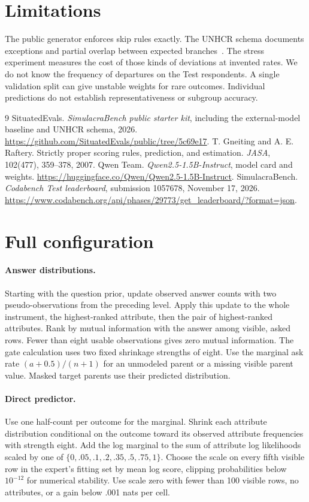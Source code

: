 \documentclass{article}
\begin{document}
\section{Limitations}
The public generator enforces skip rules exactly. The UNHCR schema documents
exceptions and partial overlap between expected branches~\cite{starter}.
The stress experiment measures the cost of those kinds of deviations at
invented rates. We do not know the frequency of departures on the Test respondents.
A single validation split can give unstable weights for rare outcomes.
Individual predictions do not establish representativeness or subgroup accuracy.

\begin{thebibliography}{9}
 SituatedEvals. \emph{SimulacraBench public starter kit},
including the external-model baseline and UNHCR schema, 2026.
\url{https://github.com/SituatedEvals/public/tree/5c69e17}.
 T. Gneiting and A. E. Raftery. Strictly proper scoring rules,
prediction, and estimation. \emph{JASA}, 102(477), 359--378, 2007.
 Qwen Team. \emph{Qwen2.5-1.5B-Instruct}, model card and weights.
\url{https://huggingface.co/Qwen/Qwen2.5-1.5B-Instruct}.
 SimulacraBench. \emph{Codabench Test leaderboard},
submission 1057678, November 17, 2026.
\url{https://www.codabench.org/api/phases/29773/get_leaderboard/?format=json}.
\end{thebibliography}

\clearpage
\appendix
\section{Full configuration}\label{config}
\paragraph{Answer distributions.} Starting with the question prior, update
observed answer counts with two pseudo-observations from the preceding level.
Apply this update to the whole instrument, the highest-ranked attribute, then
the pair of highest-ranked attributes. Rank by mutual information with the
answer among visible, asked rows. Fewer than eight usable observations gives
zero mutual information. The gate calculation uses two fixed shrinkage
strengths of eight. Use the marginal ask rate $(a+0.5)/(n+1)$ for an
unmodeled parent or a missing visible parent value. Masked target parents
use their predicted distribution.
\paragraph{Direct predictor.} Use one half-count per outcome for the marginal.
Shrink each attribute distribution conditional on the outcome toward its
observed attribute frequencies with strength eight. Add the log marginal to
the sum of attribute log likelihoods scaled by one of
$\{0,.05,.1,.2,.35,.5,.75,1\}$. Choose the scale on every fifth visible row
in the expert's fitting set by mean log score, clipping probabilities below
$10^{-12}$ for numerical stability. Use scale
zero with fewer than 100 visible rows, no attributes, or a gain below .001
nats per cell.
\end{document}
